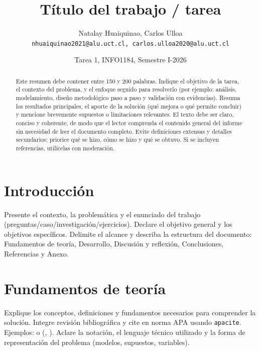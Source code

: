 \documentclass[10pt]{article}
\title{\textbf{Título del trabajo / tarea}}
\author{
Natalay Huaiquinao, Carlos Ulloa\\
\texttt{nhuaiquinao2021@alu.uct.cl, carlos.ulloa2020@alu.uct.cl}
}
\date{\vspace{-0.6em}Tarea 1, INFO1184, Semestre I-2026}
\begin{document}
\maketitle
\vspace{-1.0cm}

\begin{abstract}
Este resumen debe contener entre 150 y 200 palabras. Indique el objetivo de la tarea, el contexto del problema, y el enfoque seguido para resolverlo (por ejemplo: análisis, modelamiento, diseño metodológico paso a paso y validación con evidencias). Resuma los resultados principales, el aporte de la solución (qué mejora o qué permite concluir) y mencione brevemente supuestos o limitaciones relevantes. El texto debe ser claro, conciso y coherente, de modo que el lector comprenda el contenido general del informe sin necesidad de leer el documento completo. Evite definiciones extensas y detalles secundarios; priorice qué se hizo, cómo se hizo y qué se obtuvo. Si se incluyen referencias, utilícelas con moderación.
\end{abstract}

\section{Introducción}
Presente el contexto, la problemática y el enunciado del trabajo (preguntas/caso/investigación/ejercicios). Declare el objetivo general y los objetivos específicos. Delimite el alcance y describa la estructura del documento: Fundamentos de teoría, Desarrollo, Discusión y reflexión, Conclusiones, Referencias y Anexo.

\section{Fundamentos de teoría}
Explique los conceptos, definiciones y fundamentos necesarios para comprender la solución. Integre revisión bibliográfica y cite en norma APA usando \texttt{apacite}. Ejemplos:  o (\citeauthor{autorEjemplo2022}, \citeyear{autorEjemplo2022}). Aclare la notación, el lenguaje técnico utilizado y la forma de representación del problema (modelos, supuestos, variables).

\end{document}
